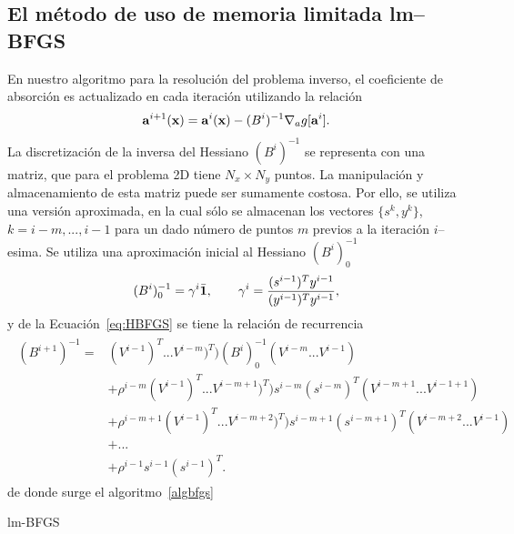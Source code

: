 \subsection{El método de uso de memoria limitada lm--BFGS}
\label{sec:lmBFGS}
En nuestro algoritmo para la resolución del problema inverso, el coeficiente 
de absorción es actualizado en cada iteración utilizando la relación 
\begin{equation}
\mathbf{a}^{i+1}(\mathbf{x})=\mathbf{a}^{i}(\mathbf{x})-(B^{i})^{-1} \nabla_a g[\mathbf{a}^i].
\label{eq:update2}
\end{equation}
La discretización de la inversa del Hessiano $(B^i)^{-1}$ se representa con una matriz,  
que para el problema 2D tiene $N_x \times N_y$ puntos. 
La manipulación y almacenamiento de esta matriz puede ser sumamente costosa. Por ello, 
 se utiliza una versión aproximada, en la cual sólo se almacenan los vectores $\{s^k, y^k\}$, 
$k=i-m,...,i-1$ para un dado número de puntos $m$ previos a la iteración $i$--esima. 
Se utiliza una aproximación inicial al Hessiano $(B^i)^{-1}_0$
\begin{equation}
(B^i)^{-1}_0=\gamma^i \bar{\mathbf{1}},\quad \quad \gamma^i=\frac{(s^{i-1})^T y^{i-1}}{(y^{i-1})^Ty^{i-1}},
\label{eq:initHess}
\end{equation}
y de la Ecuación~\eqref{eq:HBFGS} se tiene la relación de recurrencia
\begin{equation}
\begin{split}
\begin{aligned}
(B^{i+1})^{-1}=&(V^{i-1})^T...V^{i-m})^T) (B^i)^{-1}_0 (V^{i-m}...V^{i-1})  \\
&+\rho^{i-m} (V^{i-1})^T...V^{i-m+1})^T)s^{i-m} (s^{i-m})^T(V^{i-m+1}...V^{i-1+1}) \\
&+\rho^{i-m+1} (V^{i-1})^T...V^{i-m+2})^T)s^{i-m+1} (s^{i-m+1})^T(V^{i-m+2}...V^{i-1}) \\
&+...\\
&+\rho^{i-1} s^{i-1} (s^{i-1})^T. 
\end{aligned}
\end{split}
\label{eq:HBFGSrec}
\end{equation}
de donde surge el algoritmo~\eqref{algbfgs}~\cite{Byrd1995,Nocedal2006}

\begin{algorithm}
\caption{lm-BFGS}\label{algbfgs}
\end{algorithm}  
  
